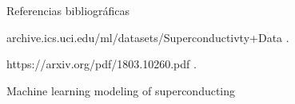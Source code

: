 \documentclass[11pt]{beamer}
\begin{document}
\begin{frame}{Referencias bibliográficas}
	\begin{thebibliography}{10}

		\beamertemplateonlinebibitems %
		archive.ics.uci.edu/ml/datasets/Superconductivty+Data
		.

		\beamertemplateonlinebibitems %
		https://arxiv.org/pdf/1803.10260.pdf
		.

		\beamertemplatearticlebibitems %
		Machine learning modeling of superconducting


	\end{thebibliography}
\end{frame}
\end{document}
